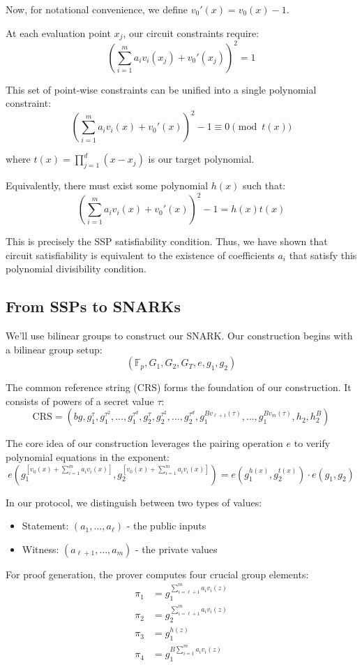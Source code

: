 Now, for notational convenience, we define $v_0'(x) = v_0(x) - 1$. 

At each evaluation point $x_j$, our circuit constraints require:
\[ \left(\sum_{i=1}^m a_i v_i(x_j) + v_0'(x_j)\right)^2 = 1 \]

This set of point-wise constraints can be unified into a single polynomial constraint:
\[ \left(\sum_{i=1}^m a_i v_i(x) + v_0'(x)\right)^2 - 1 \equiv 0 \pmod{t(x)} \]

where $t(x) = \prod_{j=1}^d (x - x_j)$ is our target polynomial.

Equivalently, there must exist some polynomial $h(x)$ such that:
\[ \left(\sum_{i=1}^m a_i v_i(x) + v_0'(x)\right)^2 - 1 = h(x)t(x) \]

This is precisely the SSP satisfiability condition. Thus, we have shown that circuit satisfiability is equivalent to the existence of coefficients $a_i$ that satisfy this polynomial divisibility condition.

\subsection{From SSPs to SNARKs}

We'll use bilinear groups to construct our SNARK. Our construction begins with a bilinear group setup:
\[ (\mathbb{F}_p, G_1, G_2, G_T, e, g_1, g_2) \]

The common reference string (CRS) forms the foundation of our construction. It consists of powers of a secret value $\tau$:
\[ \text{CRS} = (bg, g_1^\tau, g_1^{\tau^2}, \dots, g_1^{\tau^d}, g_2^\tau, g_2^{\tau^2}, \dots, g_2^{\tau^d}, g_1^{B v_{\ell + 1}(\tau)}, \dots, g_1^{B v_m(\tau)}, h_2, h_2^B) \]

The core idea of our construction leverages the pairing operation $e$ to verify polynomial equations in the exponent:
\[ e(g_1^{[v_0(x) + \sum_{i=1}^m a_i v_i(x)]}, g_2^{[v_0(x) + \sum_{i=1}^m a_i v_i(x)]}) = e(g_1^{h(x)}, g_2^{t(x)}) \cdot e(g_1, g_2) \]

In our protocol, we distinguish between two types of values:
\begin{itemize}
    \item Statement: $(a_1, \dots, a_\ell)$ - the public inputs
    \item Witness: $(a_{\ell+1}, \dots, a_m)$ - the private values
\end{itemize}

For proof generation, the prover computes four crucial group elements:
\begin{align*}
    \pi_1 &= g_1^{\sum_{i=\ell+1}^m a_i v_i(z)} \\
    \pi_2 &= g_2^{\sum_{i=\ell+1}^m a_i v_i(z)} \\
    \pi_3 &= g_1^{h(z)} \\
    \pi_4 &= g_1^{B\sum_{i=1}^m a_i v_i(z)}
\end{align*}

